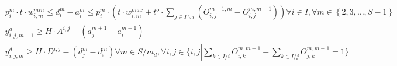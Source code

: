 \begin{align}
  & p_{i}^{m} \cdot t \cdot w_{i , m}^{min} \leq d_{i}^{m} - a_{i}^{m} \leq p_{i}^{m} \cdot \left(t \cdot w_{i , m}^{max} + t^{o} \cdot \sum_{j \in I \backslash i} \left(O_{i , j}^{m - 1 , m} - O_{i , j}^{m , m + 1}\right)\right) \forall i \in I , \forall m \in \left\{2,3 , \ldots , S - 1\right\} \tag{eq\_0010} \\
  & y_{i , j , m + 1}^{a} \geq H \cdot A^{i , j} - \left(a_{j}^{m + 1} - a_{i}^{m + 1}\right) \tag{eq\_0012\_a} \\
  & y_{i , j , m}^{d} \geq H \cdot D^{i , j} - \left(d_{j}^{m} - d_{i}^{m}\right) \forall m \in S / m_{d} , \forall i , j \in \{ i , j \left|\right. \sum_{k \in I / i} O_{i , k}^{m , m + 1} - \sum_{k \in I / j} O_{j , k}^{m , m + 1} = 1 \} \tag{eq\_0012\_b} \\
\end{align}
